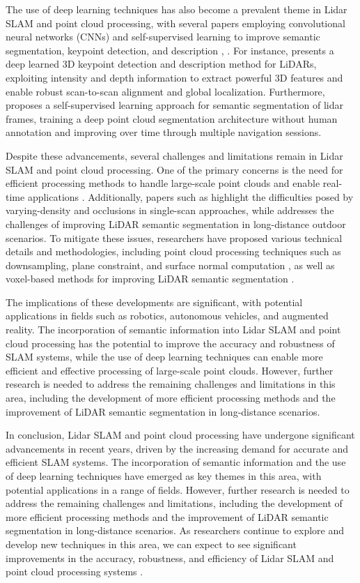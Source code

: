 \documentclass[conference]{IEEEtran}
\begin{document}
The use of deep learning techniques has also become a prevalent theme in Lidar SLAM and point cloud processing, with several papers employing convolutional neural networks (CNNs) and self-supervised learning to improve semantic segmentation, keypoint detection, and description \cite{b3}, \cite{b4}. For instance, \cite{b5} presents a deep learned 3D keypoint detection and description method for LiDARs, exploiting intensity and depth information to extract powerful 3D features and enable robust scan-to-scan alignment and global localization. Furthermore, \cite{b6} proposes a self-supervised learning approach for semantic segmentation of lidar frames, training a deep point cloud segmentation architecture without human annotation and improving over time through multiple navigation sessions.

Despite these advancements, several challenges and limitations remain in Lidar SLAM and point cloud processing. One of the primary concerns is the need for efficient processing methods to handle large-scale point clouds and enable real-time applications \cite{b7}. Additionally, papers such as \cite{b8} highlight the difficulties posed by varying-density and occlusions in single-scan approaches, while \cite{b9} addresses the challenges of improving LiDAR semantic segmentation in long-distance outdoor scenarios. To mitigate these issues, researchers have proposed various technical details and methodologies, including point cloud processing techniques such as downsampling, plane constraint, and surface normal computation \cite{b10}, as well as voxel-based methods for improving LiDAR semantic segmentation \cite{b11}.

The implications of these developments are significant, with potential applications in fields such as robotics, autonomous vehicles, and augmented reality. The incorporation of semantic information into Lidar SLAM and point cloud processing has the potential to improve the accuracy and robustness of SLAM systems, while the use of deep learning techniques can enable more efficient and effective processing of large-scale point clouds. However, further research is needed to address the remaining challenges and limitations in this area, including the development of more efficient processing methods and the improvement of LiDAR semantic segmentation in long-distance scenarios.

In conclusion, Lidar SLAM and point cloud processing have undergone significant advancements in recent years, driven by the increasing demand for accurate and efficient SLAM systems. The incorporation of semantic information and the use of deep learning techniques have emerged as key themes in this area, with potential applications in a range of fields. However, further research is needed to address the remaining challenges and limitations, including the development of more efficient processing methods and the improvement of LiDAR semantic segmentation in long-distance scenarios. As researchers continue to explore and develop new techniques in this area, we can expect to see significant improvements in the accuracy, robustness, and efficiency of Lidar SLAM and point cloud processing systems \cite{b12}.
\end{document}
